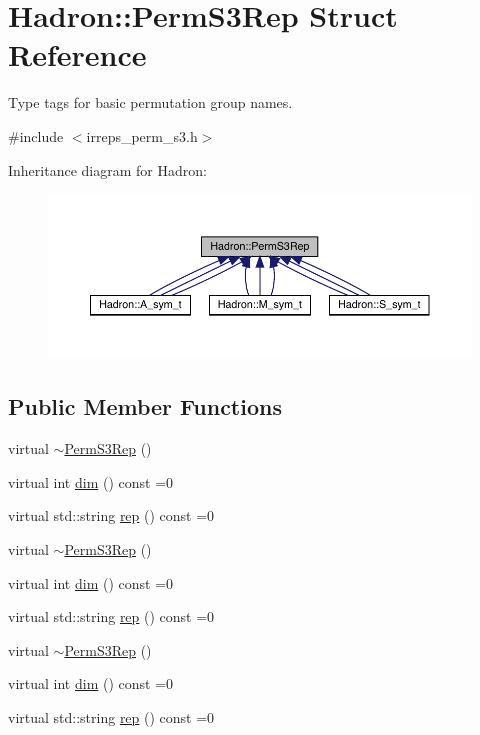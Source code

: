 \hypertarget{structHadron_1_1PermS3Rep}{}\section{Hadron\+:\+:Perm\+S3\+Rep Struct Reference}
\label{structHadron_1_1PermS3Rep}


Type tags for basic permutation group names.  




{\ttfamily \#include $<$irreps\+\_\+perm\+\_\+s3.\+h$>$}



Inheritance diagram for Hadron\+:
\nopagebreak
\begin{figure}[H]
\begin{center}
\leavevmode
\includegraphics[width=350pt]{db/db1/structHadron_1_1PermS3Rep__inherit__graph}
\end{center}
\end{figure}
\subsection*{Public Member Functions}
\begin{DoxyCompactItemize}
\item 
virtual \mbox{\hyperlink{structHadron_1_1PermS3Rep_a7a804285517d8f8511b6396c6d9d9947}{$\sim$\+Perm\+S3\+Rep}} ()
\item 
virtual int \mbox{\hyperlink{structHadron_1_1PermS3Rep_a4ce8c9c9367b6120769feae38d2f5372}{dim}} () const =0
\item 
virtual std\+::string \mbox{\hyperlink{structHadron_1_1PermS3Rep_a4f22ded21fbb16c6b7dc3d729090ef4f}{rep}} () const =0
\item 
virtual \mbox{\hyperlink{structHadron_1_1PermS3Rep_a7a804285517d8f8511b6396c6d9d9947}{$\sim$\+Perm\+S3\+Rep}} ()
\item 
virtual int \mbox{\hyperlink{structHadron_1_1PermS3Rep_a4ce8c9c9367b6120769feae38d2f5372}{dim}} () const =0
\item 
virtual std\+::string \mbox{\hyperlink{structHadron_1_1PermS3Rep_a4f22ded21fbb16c6b7dc3d729090ef4f}{rep}} () const =0
\item 
virtual \mbox{\hyperlink{structHadron_1_1PermS3Rep_a7a804285517d8f8511b6396c6d9d9947}{$\sim$\+Perm\+S3\+Rep}} ()
\item 
virtual int \mbox{\hyperlink{structHadron_1_1PermS3Rep_a4ce8c9c9367b6120769feae38d2f5372}{dim}} () const =0
\item 
virtual std\+::string \mbox{\hyperlink{structHadron_1_1PermS3Rep_a4f22ded21fbb16c6b7dc3d729090ef4f}{rep}} () const =0
\end{DoxyCompactItemize}


